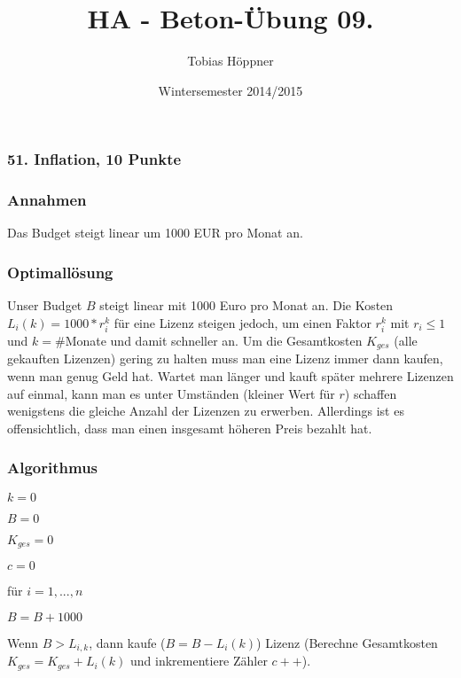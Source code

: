 \documentclass[ngerman,a4paper]{report}
\author{Tobias Höppner}
\title{HA - Beton-Übung 09.}
\date{Wintersemester 2014/2015}
\renewcommand{\maketitle}{}
\begin{document}
 
\maketitle 

\subsubsection*{51. Inflation, 10 Punkte}
\subsubsection*{Annahmen}
Das Budget steigt linear um 1000 EUR pro Monat an.
\subsubsection*{Optimallösung}
Unser Budget $B$ steigt linear mit 1000 Euro pro Monat an. Die Kosten $L_{i}(k) = 1000*r_i^k$ für eine Lizenz steigen jedoch, um einen Faktor $r_i^k$ mit $r_i\leq 1$ und $k=\#$Monate und damit schneller an. Um die Gesamtkosten $K_{ges}$ (alle gekauften Lizenzen) gering zu halten muss man eine Lizenz immer dann kaufen, wenn man genug Geld hat. Wartet man länger und kauft später mehrere Lizenzen auf einmal, kann man es unter Umständen (kleiner Wert für $r$) schaffen wenigstens die gleiche Anzahl der Lizenzen zu erwerben. Allerdings ist es offensichtlich, dass man einen insgesamt höheren Preis bezahlt hat.
\subsubsection*{Algorithmus}
\begin{compactitem}
\item $k=0$
\item $B=0$
\item $K_{ges}=0$
\item $c=0$
\item für $i = 1,...,n$
\begin{compactitem}
\item $B=B+1000$
\item Wenn $B > L_{i,k}$, dann kaufe ($B = B - L_i(k)$) Lizenz (Berechne Gesamtkosten $K_{ges}=K_{ges}+L_i(k)$ und inkrementiere Zähler $c++$).
\end{compactitem}
\end{compactitem}
\end{document}
